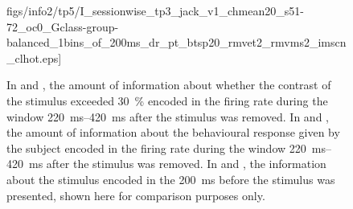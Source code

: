 \begin{figure}[htbp]
{{figs/info2/tp5/I\_sessionwise\_tp3\_jack\_v1\_chmean20\_s51-72\_oc0\_Gclass-group-balanced\_1bins\_of\_200ms\_dr\_pt\_btsp20\_rmvet2\_rmvms2\_imscn\_clhot.eps]}}
    \hspace*{\fill}
    \caption{
In \protect{} and \protect{}, the amount of information about whether the contrast of the stimulus exceeded \SI{30}{\percent} encoded in the firing rate during the window \SIrange{220}{420}{\milli\second} after the stimulus was removed.
In \protect{} and \protect{}, the amount of information about the behavioural response given by the subject encoded in the firing rate during the window \SIrange{220}{420}{\milli\second} after the stimulus was removed.
In \protect{} and \protect{}, the information about the stimulus encoded in the \SI{200}{\milli\second} before the stimulus was presented, shown here for comparison purposes only.
    \label{fig:info_tp5_v1}
}
\end{figure}


